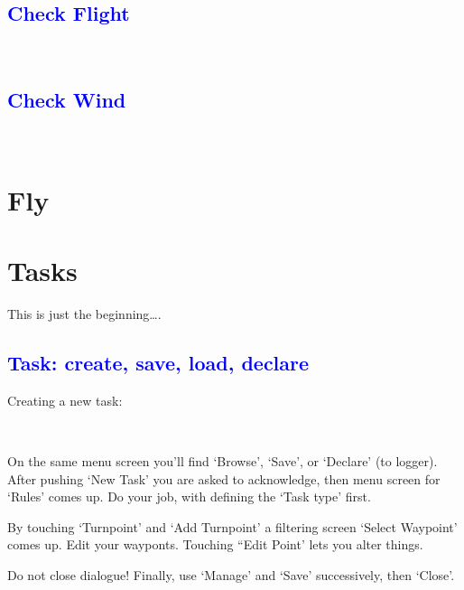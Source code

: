 \subsection*{\textcolor{blue}{Check Flight}}
\begin{flushleft}\hspace*{1cm}\blink{}\\\end{flushleft}

\subsection*{\textcolor{blue}{Check Wind}}
\begin{flushleft}\hspace*{1cm}\blink{}\\\end{flushleft}

\section{Fly}%

\newpage\section{Tasks}
This is just the beginning\dots.

\subsection*{\textcolor{blue}{Task: create, save, load, declare}}
Creating a new task:
\begin{flushleft}\hspace*{1cm}\blink{}\blink{}\\\end{flushleft}
\begin{compactitem}
\item On the same menu screen you'll find `Browse', `Save', or `Declare' (to 
logger). After pushing `New Task' you are asked to acknowledge, then menu 
screen for `Rules' comes up.  Do your job, with defining the `Task type' 
first.
\item By touching `Turnpoint' and `Add Turnpoint' a filtering screen `Select 
Waypoint' comes up. Edit your wayponts. Touching ``Edit Point' lets you alter 
things.
\item Do not close dialogue! Finally, use `Manage' and `Save' successively, 
then `Close'.
\end{compactitem}

